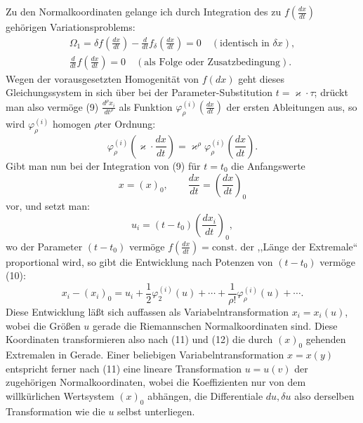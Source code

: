 \documentclass[11pt]{article}
\begin{document}
Zu den Normalkoordinaten gelange ich durch Integration des zu
\(f\!\left(\frac{dx}{dt}\right)\) gehörigen Variationsproblems:
\begin{equation}
\begin{gathered}
\Omega_1=\delta f\!\left(\frac{dx}{dt}\right)
-\frac{d}{dt}f_\delta\!\left(\frac{dx}{dt}\right)=0
\quad(\text{identisch in }\delta x),\\
\frac{d}{dt}f\!\left(\frac{dx}{dt}\right)=0
\quad(\text{als Folge oder Zusatzbedingung}).
\end{gathered}
\tag{9}
\end{equation}
Wegen der vorausgesetzten Homogenität von \(f(dx)\) geht dieses
Gleichungssystem in sich über bei der Parameter-Substitution
\(t=\varkappa\cdot\tau\); drückt man also vermöge (9)
\(\frac{d^\rho x_i}{dt^\rho}\) als Funktion
\(\varphi_\rho^{(i)}\!\left(\frac{dx}{dt}\right)\) der ersten
Ableitungen aus, so wird \(\varphi_\rho^{(i)}\) homogen \(\rho\)ter
Ordnung:
\begin{equation}
\varphi_\rho^{(i)}\!\left(\varkappa\cdot\frac{dx}{dt}\right)
=\varkappa^\rho\varphi_\rho^{(i)}\!\left(\frac{dx}{dt}\right).
\tag{10}
\end{equation}
Gibt man nun bei der Integration von (9) für \(t=t_0\) die Anfangswerte
\[
x=(x)_0,\qquad \frac{dx}{dt}=\left(\frac{dx}{dt}\right)_0
\]
vor, und setzt man:
\begin{equation}
u_i=(t-t_0)\left(\frac{dx_i}{dt}\right)_0,
\tag{11}
\end{equation}
wo der Parameter \((t-t_0)\) vermöge
\(f\!\left(\frac{dx}{dt}\right)=\mathrm{const.}\) der ,,Länge der
Extremale`` proportional wird, so gibt die Entwicklung nach Potenzen
von \((t-t_0)\) vermöge (10):
\begin{equation}
x_i-(x_i)_0=u_i+\frac12\varphi_2^{(i)}(u)+\cdots+
\frac{1}{\rho!}\varphi_\rho^{(i)}(u)+\cdots .
\tag{12}
\end{equation}
Diese Entwicklung läßt sich auffassen als Variabelntransformation
\(x_i=x_i(u)\), wobei die Größen \(u\) gerade die Riemannschen
Normalkoordinaten sind. Diese Koordinaten transformieren also nach
(11) und (12) die durch \((x)_0\) gehenden Extremalen in Gerade. Einer
beliebigen Variabelntransformation \(x=x(y)\) entspricht ferner nach
(11) eine lineare Transformation \(u=u(v)\) der zugehörigen
Normalkoordinaten, wobei die Koeffizienten nur von dem willkürlichen
Wertsystem \((x)_0\) abhängen, die Differentiale \(du,\delta u\) also
derselben Transformation wie die \(u\) selbst unterliegen.
\end{document}
